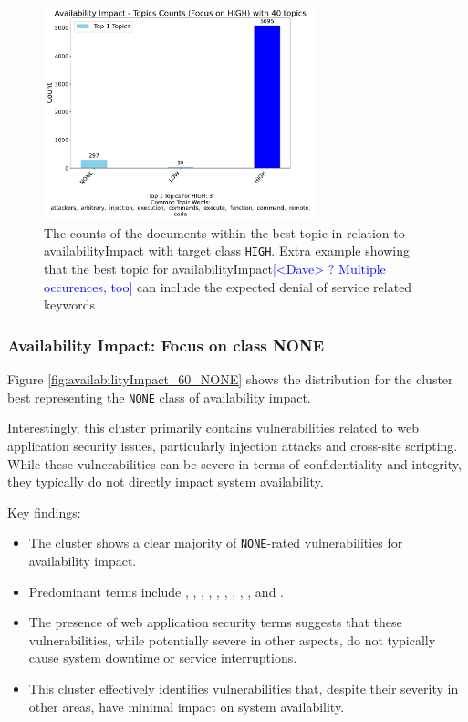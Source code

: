 \documentclass[12pt]{article}
\newcommand{\note}[2][red]{\textcolor{#1}{#2}}
\newcommand{\notedme}[1]{\note[blue]{[<Dave> #1]}}
\begin{document}
\begin{figure}[ht]
	\centering
	\includegraphics[width=0.7\textwidth]{figures/availabilityImpact/merged_top_k_topics_category_focus_counts_availabilityImpact_HIGH_k1.pdf}
	\caption{The counts of the documents within the best topic in relation to availabilityImpact
		with target class \texttt{HIGH}. Extra example showing that the best topic for
		availabilityImpact\notedme{? Multiple occurences, too} can include the expected denial of service related keywords}
	\label{fig:availabilityImpact_60_HIGH_denial}
\end{figure}
\subsubsection{Availability Impact: Focus on class NONE}

Figure \ref{fig:availabilityImpact_60_NONE} shows the distribution for the cluster best representing
the \texttt{NONE} class of availability impact.

Interestingly, this cluster primarily contains vulnerabilities related to web application security
issues, particularly injection attacks and cross-site scripting. While these vulnerabilities can be
severe in terms of confidentiality and integrity, they typically do not directly impact system
availability.

Key findings:

\begin{itemize}

	\item The cluster shows a clear majority of \texttt{NONE}-rated vulnerabilities for availability
	      impact.

	\item Predominant terms include , , , , , ,
	      , , , and .

	\item The presence of web application security terms suggests that these vulnerabilities, while
	      potentially severe in other aspects, do not typically cause system downtime or service
	      interruptions.

	\item This cluster effectively identifies vulnerabilities that, despite their severity in other
	      areas, have minimal impact on system availability.

\end{itemize}
\end{document}

